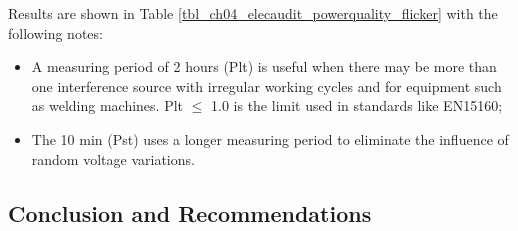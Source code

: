 Results are shown in Table \ref{tbl_ch04_elecaudit_powerquality_flicker} with the following notes:

\begin{itemize}
	\item A measuring period of 2 hours (Plt) is useful when there may be more than one interference source with irregular working cycles and for equipment such as welding machines. Plt $\leq$ 1.0 is the limit used in standards like EN15160;
	\item The 10 min (Pst) uses a longer measuring period to eliminate the influence of random voltage variations.
	
	
\end{itemize}
%



%
\subsection{Conclusion and Recommendations}


